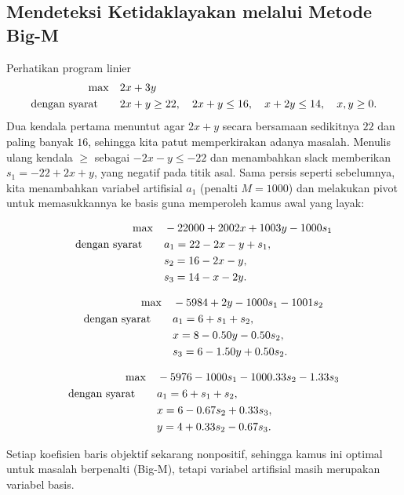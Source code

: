 %
%
\subsection{Mendeteksi Ketidaklayakan melalui Metode Big-M}

Perhatikan program linier
\[
\begin{aligned}
\max\quad & 2x + 3y \\
\mbox{dengan syarat}\quad\quad & 2x + y \geq 22,\quad 2x + y \leq 16,\quad x + 2y \leq 14,\quad x,y \geq 0.
\end{aligned}
\]
Dua kendala pertama menuntut agar $2x+y$ secara bersamaan sedikitnya $22$ dan paling banyak $16$, sehingga kita patut memperkirakan adanya masalah. Menulis ulang kendala $\ge$ sebagai $-2x-y\le-22$ dan menambahkan slack memberikan $s_1 = -22 + 2x + y$, yang negatif pada titik asal. Sama persis seperti sebelumnya, kita menambahkan variabel artifisial $a_1$ (penalti $M=1000$) dan melakukan pivot untuk memasukkannya ke basis guna memperoleh kamus awal yang layak:
\begin{center}\begin{dict}
\[
\begin{aligned}
\max\quad & -22000 + 2002x + 1003y - 1000s_1 \\
\mbox{dengan syarat}\quad\quad & a_1 = 22 - 2x - y + s_1,\\
& s_2 = 16 - 2x - y,\\
& s_3 = 14 - x - 2y.
\end{aligned}
\]
\end{dict}\end{center}
\begin{center}\begin{dict}
\[
\begin{aligned}
\max\quad & -5984 + 2y - 1000s_1 - 1001s_2 \\
\mbox{dengan syarat}\quad\quad & a_1 = 6 + s_1 + s_2,\\
& x = 8 - 0.50y - 0.50s_2,\\
& s_3 = 6 - 1.50y + 0.50s_2.
\end{aligned}
\]
\end{dict}\end{center}
\begin{center}
\begin{tcolorbox}[enhanced,width=0.6\linewidth,box align=center,colback=red!4,colframe=red!65!black,
  boxrule=0.8pt,sharp corners,coltitle=white,fonttitle=\bfseries,
  title={\ding{56}\ Optimal untuk Big-M: variabel artifisial tersangkut dalam basis},
  left=6pt,right=6pt,top=3pt,bottom=3pt]
\[
\begin{aligned}
\max\quad & -5976 - 1000s_1 - 1000.33s_2 - 1.33s_3 \\
\mbox{dengan syarat}\quad\quad & a_1 = 6 + s_1 + s_2,\\
& x = 6 - 0.67s_2 + 0.33s_3,\\
& y = 4 + 0.33s_2 - 0.67s_3.
\end{aligned}
\]
\end{tcolorbox}
\end{center}
Setiap koefisien baris objektif sekarang nonpositif, sehingga kamus ini optimal untuk masalah berpenalti (Big-M), tetapi variabel artifisial masih merupakan variabel basis.

